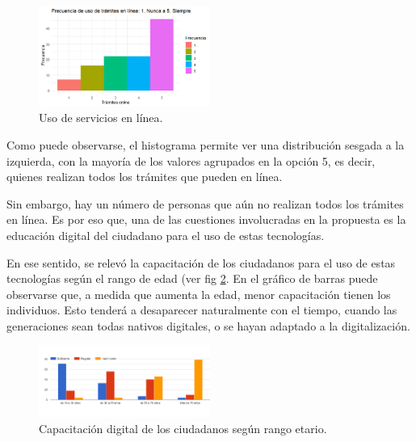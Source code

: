 \documentclass[a4paper]{article}
\begin{document}
\begin{figure}
\centering
\includegraphics[width=0.5\textwidth]{Imagen3.png}
\caption{\label{fig:Imagen3}Uso de servicios en línea.}
\end{figure}

Como puede observarse, el histograma permite ver una distribución sesgada a la izquierda, con la mayoría de los valores agrupados en la opción 5, es decir, quienes realizan todos los trámites que pueden en línea. 

Sin embargo, hay un número de personas que aún no realizan todos los trámites en línea. Es por eso que, una de las cuestiones involucradas en la propuesta es la educación digital del ciudadano para el uso de estas tecnologías. 

En ese sentido, se relevó la capacitación de los ciudadanos para el uso de estas tecnologías según el rango de edad (ver fig \ref{fig:Imagen4}. En el gráfico de barras puede observarse que, a medida que aumenta la edad, menor capacitación tienen los individuos. Esto tenderá a desaparecer naturalmente con el tiempo, cuando las generaciones sean todas nativos digitales, o se hayan adaptado a la digitalización.

\begin{figure}
\centering
\includegraphics[width=0.5\textwidth]{Imagen4.png}
\caption{\label{fig:Imagen4}Capacitación digital de los ciudadanos según rango etario.}
\end{figure}
\end{document}
